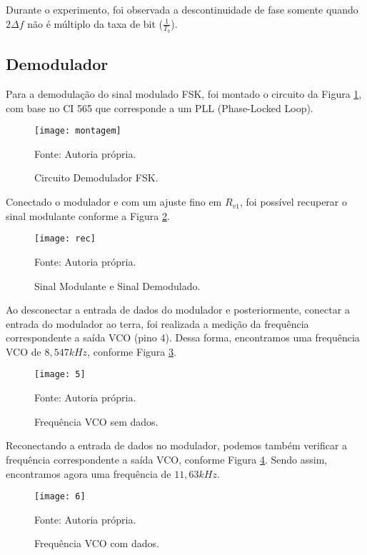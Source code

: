 Durante o experimento, foi observada a descontinuidade de fase somente quando $2 \Delta{f}$ não é múltiplo da taxa de bit ($\frac{1}{T_b}$).

\subsection{Demodulador}

Para a demodulação do sinal modulado FSK, foi montado o circuito da Figura \ref{fig:montagem}, com base no CI 565 que corresponde a um PLL (Phase-Locked Loop).

\begin{figure}[H]
    \centering
    \caption{Circuito Demodulador FSK.}
    \texttt{[image: montagem]}
    \label{fig:montagem}
    
    \small Fonte:  Autoria própria.
\end{figure}

Conectado o modulador e com um ajuste fino em $R_{v1}$, foi possível recuperar o sinal modulante conforme a Figura \ref{fig:rec}.

\begin{figure}[H]
    \centering
    \caption{Sinal Modulante e Sinal Demodulado.}
    \texttt{[image: rec]}
    \label{fig:rec}
    
    \small Fonte:  Autoria própria.
\end{figure}

Ao desconectar a entrada de dados do modulador e posteriormente, conectar a entrada do modulador ao terra, foi realizada a medição da frequência correspondente a saída VCO (pino 4). Dessa forma, encontramos uma frequência VCO de $8,547 kHz$, conforme Figura \ref{fig:5}.

\begin{figure}[H]
    \centering
    \caption{Frequência VCO sem dados.}
    \texttt{[image: 5]}
    \label{fig:5}
    
    \small Fonte:  Autoria própria.
\end{figure}

Reconectando a entrada de dados no modulador, podemos também verificar a frequência correspondente a saída VCO, conforme Figura \ref{fig:6}. Sendo assim, encontramos agora uma frequência de $11,63 kHz$.

\begin{figure}[H]
    \centering
    \caption{Frequência VCO com dados.}
    \texttt{[image: 6]}
    \label{fig:6}
    
    \small Fonte:  Autoria própria.
\end{figure}

\newpage